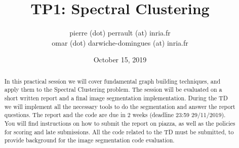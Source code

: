 \documentclass{article}
\begin{document}
\title{TP1: Spectral Clustering}
\author{pierre (dot) perrault (at) inria.fr \\ omar (dot) darwiche-domingues (at) inria.fr}
\date{October 15, 2019}
\maketitle

\begin{abstract}
    In this practical session we will cover fundamental graph building
    techniques, and apply them to the Spectral Clustering problem.
    The session will be evaluated on a short written report and a final
    image segmentation implementation. During
    the TD we will implement all the necessary tools to do the
    segmentation and answer the
    report questions.
    The report and the code are due in 2 weeks (deadline 23:59 29/11/2019).
    You will find instructions on how to submit the report on piazza,
    as well as the policies for scoring and late submissions.
    All the code related to the TD must be submitted,
    to provide background for the image segmentation code evaluation.

\end{abstract}

\newpage



%
%
%
%
\end{document}
